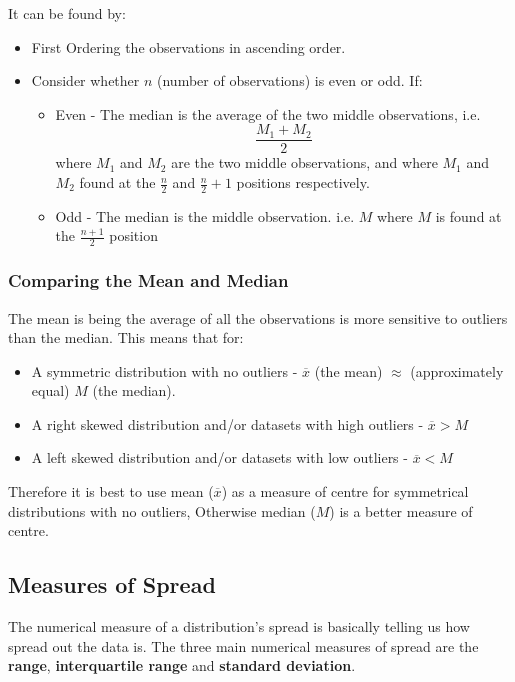 \documentclass[12pt letter]{report}
\begin{document}
It can be found by:
\begin{itemize}
	\item First Ordering the observations in ascending order.
	\item Consider whether $n$ (number of observations) is even or odd. If:
	      \begin{itemize}
		      \item Even - The median is the average of the two middle observations, i.e.
		            \[
			            \frac{M_1 + M_2}{2}
		            \]  where
		            $M_1$ and $M_2$ are the two middle observations, and where $M_1$ and $M_2$ found at the $\frac{n}{2}$ and $\frac{n}{2} + 1$ positions respectively.
		      \item Odd - The median is the middle observation. i.e. $M$ where $M$ is found at the $\frac{n + 1}{2}$
		            position
	      \end{itemize}
\end{itemize}

\subsubsection{Comparing the Mean and Median}

The mean is being the average of all the observations is more sensitive to outliers than the median. This means that for:
\begin{itemize}
	\item A symmetric distribution with no outliers - $\overline{x}$ (the mean) $\approx$ (approximately equal) $M$ (the median).
	\item A right skewed distribution and/or datasets with high outliers - $\overline{x} > M$
	\item A left skewed distribution and/or datasets with low outliers - $\overline{x} < M$
\end{itemize}

Therefore it is best to use mean ($\overline{x}$) as a measure of centre for symmetrical distributions with no outliers, Otherwise
median ($M$) is a better measure of centre.

\subsection{Measures of Spread}

The numerical measure of a distribution's spread is basically telling us how spread out the data is. The three main numerical measures of spread are the \textbf{range}, \textbf{interquartile range} and \textbf{standard deviation}.
\end{document}
